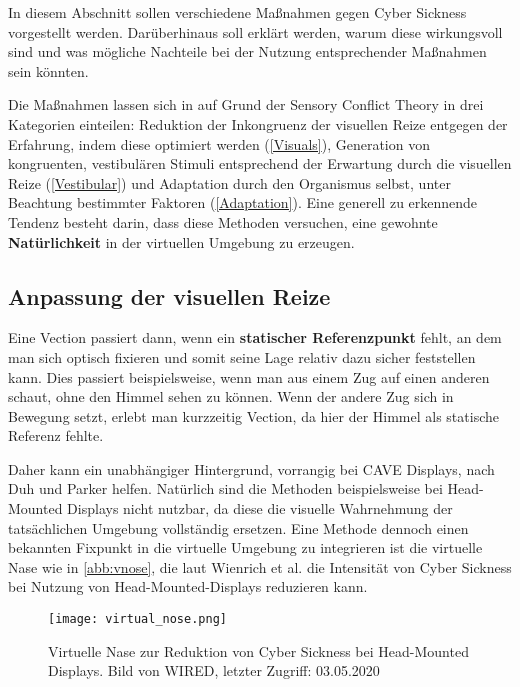In diesem Abschnitt sollen verschiedene Ma{\ss}nahmen gegen Cyber Sickness vorgestellt werden. Dar\"uberhinaus soll erkl\"art werden, warum diese wirkungsvoll sind und was m\"ogliche Nachteile bei der Nutzung entsprechender Ma{\ss}nahmen sein k\"onnten.

Die Ma{\ss}nahmen lassen sich in auf Grund der Sensory Conflict Theory in drei Kategorien einteilen: 
Reduktion der Inkongruenz der visuellen Reize entgegen der Erfahrung, indem diese optimiert werden (\autoref{Visuals}), Generation von kongruenten, vestibul\"aren Stimuli entsprechend der Erwartung durch die visuellen Reize (\autoref{Vestibular}) und Adaptation durch den Organismus selbst, unter Beachtung bestimmter Faktoren (\autoref{Adaptation}). Eine generell zu erkennende Tendenz besteht darin, dass diese Methoden versuchen, eine gewohnte \textbf{Nat\"urlichkeit} in der virtuellen Umgebung zu erzeugen.

\subsection{Anpassung der visuellen Reize}\label{Visuals}
Eine Vection passiert dann, wenn ein \textbf{statischer Referenzpunkt} fehlt, an dem man sich optisch fixieren und somit seine Lage relativ dazu sicher feststellen kann. Dies passiert beispielsweise, wenn man aus einem Zug auf einen anderen schaut, ohne den Himmel sehen zu k\"onnen. Wenn der andere Zug sich in Bewegung setzt, erlebt man kurzzeitig Vection, da hier der Himmel als statische Referenz fehlte.

Daher kann ein unabh\"angiger Hintergrund, vorrangig bei CAVE Displays, nach Duh und Parker \cite{Duh:2001:Static} helfen. Nat\"urlich sind die Methoden beispielsweise bei Head-Mounted Displays nicht nutzbar, da diese die visuelle Wahrnehmung der tats\"achlichen Umgebung vollst\"andig ersetzen. Eine Methode dennoch einen bekannten Fixpunkt in die virtuelle Umgebung zu integrieren ist die virtuelle Nase wie in \autoref{abb:vnose}, die laut Wienrich et al.\cite{Wienrich:2018:Nose} die Intensit\"at von Cyber Sickness bei Nutzung von Head-Mounted-Displays reduzieren kann.


\begin{figure}[tbh]
	\centering 
	\texttt{[image: virtual\_nose.png]}
	\caption{Virtuelle Nase zur Reduktion von Cyber Sickness bei Head-Mounted Displays. Bild von WIRED\cite{WIRED:2020:Nose}, letzter Zugriff: 03.05.2020}
	\label{abb:vnose}
\end{figure}


